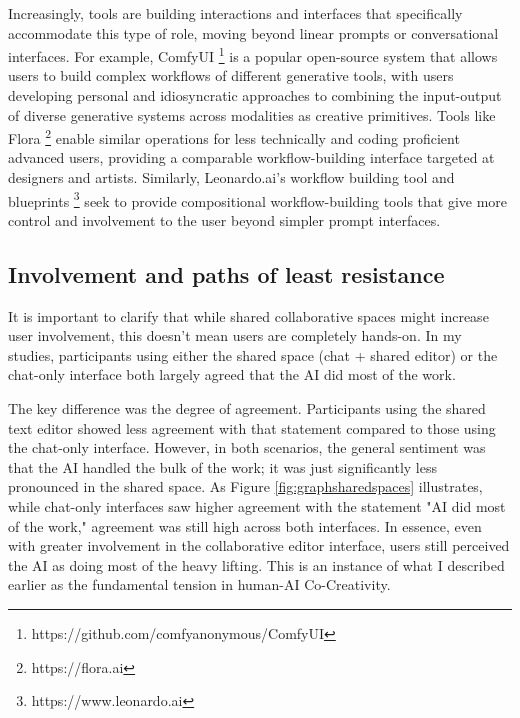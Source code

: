 Increasingly, tools are building interactions and interfaces that specifically accommodate this type of role, moving beyond linear prompts or conversational interfaces. For example, ComfyUI \footnote{https://github.com/comfyanonymous/ComfyUI} is a popular open-source system that allows users to build complex workflows of different generative tools, with users developing personal and idiosyncratic approaches to combining the input-output of diverse generative systems across modalities as creative primitives. Tools like Flora \footnote{https://flora.ai} enable similar operations for less technically and coding proficient advanced users, providing a comparable workflow-building interface targeted at designers and artists. Similarly, Leonardo.ai's workflow building tool and blueprints \footnote{https://www.leonardo.ai} seek to provide compositional workflow-building tools that give more control and involvement to the user beyond simpler prompt interfaces.

\subsection{Involvement and paths of least resistance}

It is important to clarify that while shared collaborative spaces might increase user involvement, this doesn't mean users are completely hands-on. In my studies, participants using either the shared space (chat + shared editor) or the chat-only interface both largely agreed that the AI did most of the work.

The key difference was the degree of agreement. Participants using the shared text editor showed less agreement with that statement compared to those using the chat-only interface. However, in both scenarios, the general sentiment was that the AI handled the bulk of the work; it was just significantly less pronounced in the shared space. As Figure \ref{fig:graphsharedspaces} illustrates, while chat-only interfaces saw higher agreement with the statement "AI did most of the work," agreement was still high across both interfaces. In essence, even with greater involvement in the collaborative editor interface, users still perceived the AI as doing most of the heavy lifting. This is an instance of what I described earlier as the fundamental tension in human-AI Co-Creativity.

